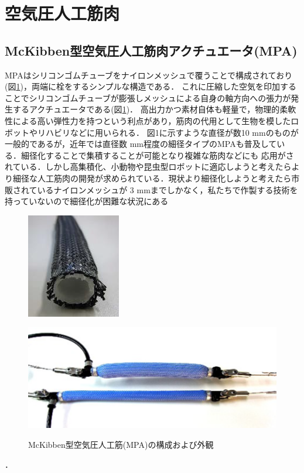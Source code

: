 \newpage
\section{空気圧人工筋肉}
\subsection{McKibben型空気圧人工筋肉アクチュエータ(MPA)}
MPAはシリコンゴムチューブをナイロンメッシュで覆うことで構成されており(図\ref{fig:MPA})，両端に栓をするシンプルな構造である．
これに圧縮した空気を印加することでシリコンゴムチューブが膨張しメッシュによる自身の軸方向への張力が発生するアクチュエータである\cite{1}(図\ref{fig:MPA})．
高出力かつ素材自体も軽量で，物理的柔軟性による高い弾性力を持つという利点があり，筋肉の代用として生物を模したロボットやリハビリなどに用いられる．
図1に示すような直径が数10 mmのものが一般的であるが，近年では直径数 mm程度の細径タイプのMPAも普及している\cite{2}．細径化することで集積することが可能となり複雑な筋肉などにも
応用がされている．しかし高集積化、小動物や昆虫型ロボットに適応しようと考えたらより細径な人工筋肉の開発が求められている．現状より細径化しようと考えたら市販されているナイロンメッシュが
3 mmまでしかなく，私たちで作製する技術を持っていないので細径化が困難な状況にある
\begin{figure}[ht]
    \begin{minipage}{0.49\columnwidth}
      \vspace{4mm}
      \centering
      \includegraphics[scale=1]{pic/MPA_kousei.png}
      \vspace{3mm}
      \label{fig:Structure}
    \end{minipage}
    \begin{minipage}{0.49\columnwidth}
      \vspace{25mm}
      \centering
      \includegraphics[scale=0.8]{pic/MPA_dousa.png}
      \label{fig:move}
    \end{minipage}
    \caption{McKibben型空気圧人工筋(MPA)の構成および外観\cite{中西大輔2020}}
    \label{fig:MPA}
  \end{figure}．
\newpage
